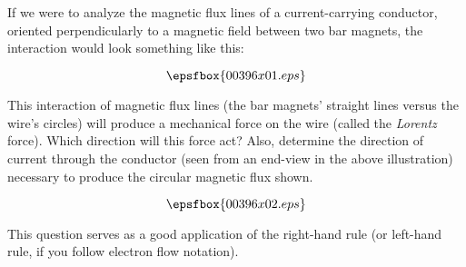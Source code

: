 

If we were to analyze the magnetic flux lines of a current-carrying conductor, oriented perpendicularly to a magnetic field between two bar magnets, the interaction would look something like this:

$$\epsfbox{00396x01.eps}$$

This interaction of magnetic flux lines (the bar magnets' straight lines versus the wire's circles) will produce a mechanical force on the wire (called the {\it Lorentz} force).  Which direction will this force act?  Also, determine the direction of current through the conductor (seen from an end-view in the above illustration) necessary to produce the circular magnetic flux shown.







$$\epsfbox{00396x02.eps}$$







This question serves as a good application of the right-hand rule (or left-hand rule, if you follow electron flow notation).




